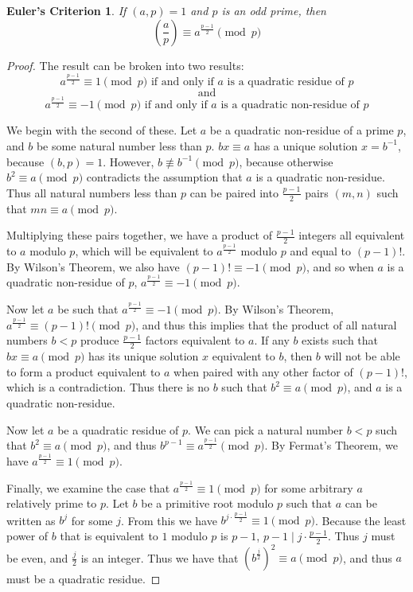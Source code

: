 \documentclass{article}
\begin{document}
\newtheorem*{eulercriterion}{Euler's Criterion}
\begin{eulercriterion}
If $(a,p)  = 1$ and $p$ is an odd prime, then 
	$$ \left( \frac{a}{p} \right)  \equiv a^{\frac{p-1}{2}} \pmod p$$
\end{eulercriterion}
\begin{proof}
The result can be broken into two results:
	$$a^{\frac{p-1}{2}} \equiv 1 \pmod p \text{ if and only if } a \text{ is a quadratic residue of } p$$
	$$\text{ and }$$
	$$a^{\frac{p-1}{2}} \equiv -1 \pmod p \text{ if and only if } a \text{ is a quadratic non-residue of } p$$
	
\par We begin with the second of these. Let $a$ be a quadratic non-residue of a prime $p$, and $b$ be some natural number less than $p$. $bx \equiv a$ has a unique solution $x = b^{-1}$, because $(b,p) = 1$. However, $b \not \equiv b^{-1} \pmod p$, because otherwise $b^2 \equiv a \pmod p$ contradicts the assumption that $a$ is a quadratic non-residue. Thus all natural numbers less than $p$ can be paired into $\frac{p-1}{2}$ pairs $(m,n)$ such that $mn \equiv a \pmod p$. 
\par Multiplying these pairs together, we have a product of  $\frac{p-1}{2}$ integers all equivalent to $a$ modulo $p$, which will be equivalent to $a^\frac{p-1}{2}$ modulo $p$ and  equal to $(p-1)!$. By Wilson's Theorem, we also have $(p-1)! \equiv -1 \pmod p$, and so when $a$ is a quadratic non-residue of $p$, $a^\frac{p-1}{2} \equiv -1 \pmod p$.
\par Now let $a$ be such that $a^\frac{p-1}{2} \equiv -1 \pmod p$. By Wilson's Theorem, $a^\frac{p-1}{2} \equiv (p-1)! \pmod p$, and thus this implies that the product of all natural  numbers $b < p$ produce $\frac{p-1}{2}$ factors equivalent to $a$. If any $b$ exists such that $bx \equiv a \pmod p$ has its unique solution $x$ equivalent to $b$, then $b$ will not be able to form a product equivalent to $a$ when paired with any other factor of $(p-1)!$, which is a contradiction. Thus there is no $b$ such that $b^2 \equiv a \pmod p$, and $a$ is a quadratic non-residue.
\par Now let $a$ be a quadratic residue of $p$. We can pick a natural number $b < p$ such that $b^2 \equiv a \pmod p$, and thus $ b^{p-1} \equiv a^\frac{p-1}{2} \pmod p$. By Fermat's Theorem, we have $ a^\frac{p-1}{2} \equiv 1 \pmod p$.
\par Finally, we examine the case that  $a^\frac{p-1}{2} \equiv 1 \pmod p$ for some arbitrary $a$ relatively prime to $p$. Let $b$ be a primitive root modulo $p$ such that $a$ can be written as $b^j$ for some $j$. From this we have $b^{j \cdot \frac{p-1}{2}} \equiv 1 \pmod p$. Because the least power of $b$ that is equivalent to $1$ modulo $p$ is $p-1$, $p -1 \mid j \cdot \frac{p-1}{2}$. Thus $j$ must be even, and $\frac{j}{2}$ is an integer. Thus we have that $(b^{\frac{j}{2}})^2 \equiv a \pmod p$, and thus $a$ must be a quadratic residue.
	
\end{proof}
\end{document}
